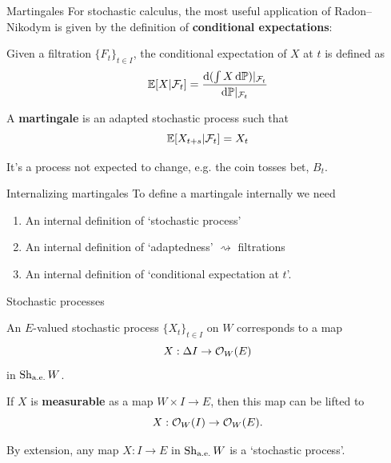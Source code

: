 \begin{frame}{Martingales}
	For stochastic calculus, the most useful application of Radon--Nikodym is given by the definition of \textbf{conditional expectations}:
	\begin{definition}
		Given a filtration $\{F_t\}_{t \in I}$, the conditional expectation of $X$ at $t$ is defined as
		\begin{equation*}
			\mathbb{E}[X | \mathcal{F}_t] = \frac{\mathrm{d}{(\int X \, \mathrm{d}\mathbb{P})\vert_{\mathcal{F}_t}}}{\mathrm{d}{\mathbb{P}\vert_{\mathcal{F}_t}}}
		\end{equation*}
	\end{definition}
	\begin{definition}
		A \textbf{martingale} is an adapted stochastic process such that
		\begin{equation*}
			\mathbb{E}[ X_{t+s} | \mathcal{F}_t] = X_t
		\end{equation*}
	\end{definition}
	It's a process not expected to change, e.g. the coin tosses bet, $B_t$.
\end{frame}

\begin{frame}{Internalizing martingales}
	To define a martingale internally we need

	\vfill
	\begin{enumerate}
		\item An internal definition of `stochastic process'
		\item An internal definition of `adaptedness' $\rightsquigarrow$ {\color{colorgold}filtrations}
		\item An internal definition of `conditional expectation at $t$'.
	\end{enumerate}

	\vfill
\end{frame}

\begin{frame}{Stochastic processes}
	\begin{theorem}
		An $E$-valued stochastic process $\{X_t\}_{t \in I}$ on $W$ corresponds to a map
		\begin{equation*}
			X:\Delta I \to \mathcal{O}_W(E)
		\end{equation*}
		in $\operatorname{Sh}_{\text{a.e.}} W$.
	\end{theorem}

	\vfill
	If $X$ is \textbf{measurable} as a map $W \times I \to E$, then this map can be lifted to
	\begin{equation*}
		X : \mathcal{O}_W(I) \to \mathcal{O}_W(E).
	\end{equation*}

	\vfill
	By extension, any map $X:I \to E$ in $\operatorname{Sh}_{\text{a.e.}} W$ is a `stochastic process'.

\end{frame}

